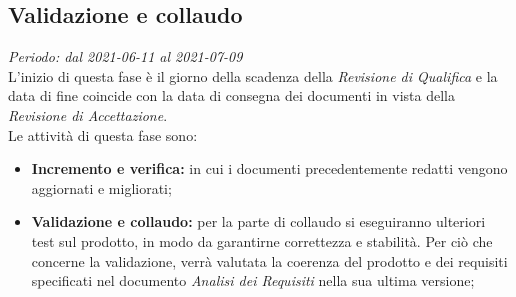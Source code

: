     \subsection{Validazione e collaudo}
        \textit{Periodo: dal 2021-06-11 al 2021-07-09}\\
        L’inizio di questa fase è il giorno della scadenza della \textit{Revisione di Qualifica} e la data di fine coincide con la data di consegna dei documenti in vista della \textit{Revisione di Accettazione}.\\
        Le attività di questa fase sono:
        \begin {itemize}
            \item \textbf{Incremento e verifica:} in cui i documenti precedentemente redatti vengono aggiornati e migliorati;
            \item \textbf{Validazione e collaudo:} per la parte di collaudo si eseguiranno ulteriori test sul prodotto, in modo da garantirne correttezza e stabilità. Per ciò che concerne la validazione, verrà valutata la coerenza del prodotto e dei requisiti specificati nel documento \textit{Analisi dei Requisiti} nella sua ultima versione;
        \end {itemize}